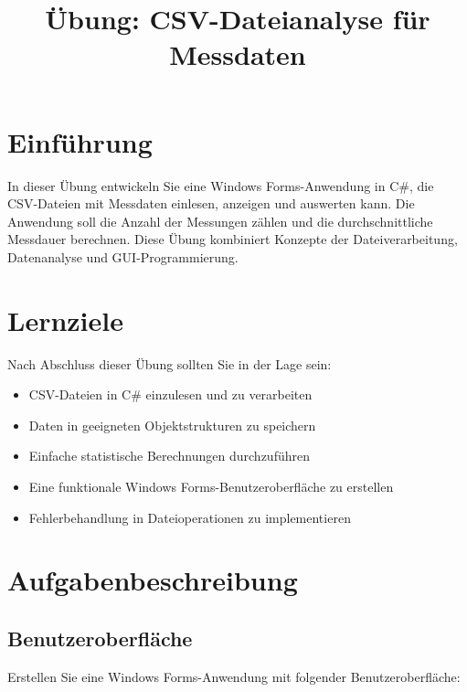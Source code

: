 \documentclass[a4paper,11pt]{article}
\title{\textbf{Übung: CSV-Dateianalyse für Messdaten}}
\author{}
\date{}
\begin{document}
\maketitle
\tableofcontents
\newpage

\section{Einführung}
In dieser Übung entwickeln Sie eine Windows Forms-Anwendung in C\#, die CSV-Dateien mit Messdaten einlesen, anzeigen und auswerten kann. Die Anwendung soll die Anzahl der Messungen zählen und die durchschnittliche Messdauer berechnen. Diese Übung kombiniert Konzepte der Dateiverarbeitung, Datenanalyse und GUI-Programmierung.

\section{Lernziele}
Nach Abschluss dieser Übung sollten Sie in der Lage sein:
\begin{itemize}
    \item CSV-Dateien in C\# einzulesen und zu verarbeiten
    \item Daten in geeigneten Objektstrukturen zu speichern
    \item Einfache statistische Berechnungen durchzuführen
    \item Eine funktionale Windows Forms-Benutzeroberfläche zu erstellen
    \item Fehlerbehandlung in Dateioperationen zu implementieren
\end{itemize}

\section{Aufgabenbeschreibung}

\subsection{Benutzeroberfläche}
Erstellen Sie eine Windows Forms-Anwendung mit folgender Benutzeroberfläche:
\end{document}
